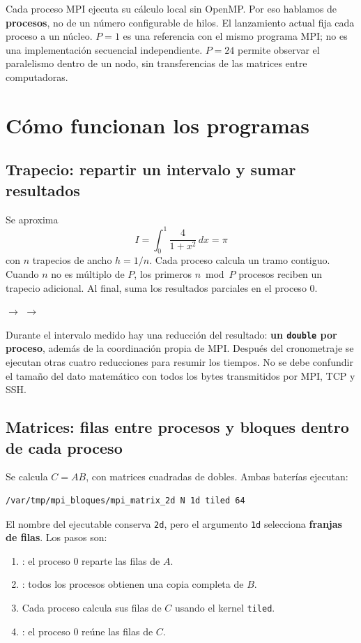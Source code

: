 Cada proceso MPI ejecuta su cálculo local sin OpenMP. Por eso hablamos de \textbf{procesos}, no de un número configurable de hilos. El lanzamiento actual fija cada proceso a un núcleo. $P=1$ es una referencia con el mismo programa MPI; no es una implementación secuencial independiente. $P=24$ permite observar el paralelismo dentro de un nodo, sin transferencias de las matrices entre computadoras.

\clearpage
\section{Cómo funcionan los programas}

\subsection{Trapecio: repartir un intervalo y sumar resultados}
Se aproxima
\[
 I=\int_0^1\frac{4}{1+x^2}\,dx=\pi
\]
con $n$ trapecios de ancho $h=1/n$. Cada proceso calcula un tramo contiguo. Cuando $n$ no es múltiplo de $P$, los primeros $n\bmod P$ procesos reciben un trapecio adicional. Al final,  suma los resultados parciales en el proceso 0.

\begin{center}
\quad$\longrightarrow$\quad
{}\quad$\longrightarrow$\quad
{}
\end{center}

Durante el intervalo medido hay una reducción del resultado: \textbf{un \texttt{double} por proceso}, además de la coordinación propia de MPI. Después del cronometraje se ejecutan otras cuatro reducciones para resumir los tiempos. No se debe confundir el tamaño del dato matemático con todos los bytes transmitidos por MPI, TCP y SSH.

\subsection{Matrices: filas entre procesos y bloques dentro de cada proceso}
Se calcula $C=A B$, con matrices cuadradas de dobles. Ambas baterías ejecutan:
\begin{lstlisting}[language=bash]
/var/tmp/mpi_bloques/mpi_matrix_2d N 1d tiled 64
\end{lstlisting}
El nombre del ejecutable conserva \texttt{2d}, pero el argumento \texttt{1d} selecciona \textbf{franjas de filas}. Los pasos son:
\begin{enumerate}
\item {}: el proceso 0 reparte las filas de $A$.
\item {}: todos los procesos obtienen una copia completa de $B$.
\item Cada proceso calcula sus filas de $C$ usando el kernel \texttt{tiled}.
\item {}: el proceso 0 reúne las filas de $C$.
\end{enumerate}

